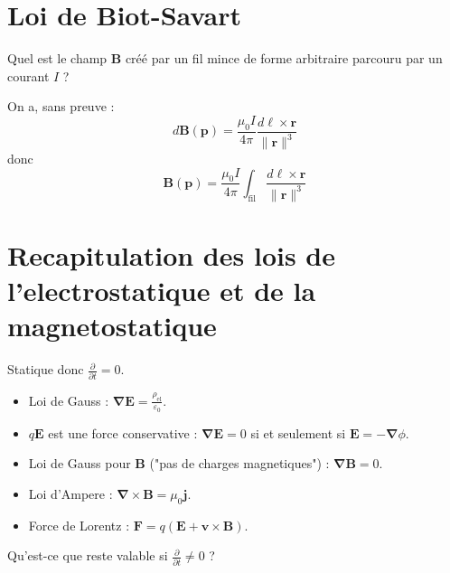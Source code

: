 \section{Loi de Biot-Savart}
\begin{question}
Quel est le champ $\boldsymbol{B}$ créé par un fil mince de forme arbitraire parcouru par un courant $I$ ?
\end{question}
On a, sans preuve :
$$
d\boldsymbol{B}(\boldsymbol{p})=\frac{\mu_{0}I}{4\pi} \frac{d\boldsymbol{\ell}\times \boldsymbol{r}}{\lVert \boldsymbol{r} \rVert ^{3}}
$$
donc
$$
\boldsymbol{B}(\boldsymbol{p})=\frac{\mu_{0}I}{4\pi} \int _{\mathrm{fil}} \frac{d\boldsymbol{\ell}\times \boldsymbol{r}}{\lVert \boldsymbol{r} \rVert ^{3}}
$$

\section{Recapitulation des lois de l'electrostatique et de la magnetostatique}
Statique donc $\frac{ \partial  }{ \partial t }=0$.
\begin{itemize}
\item Loi de Gauss : $\boldsymbol{\nabla E}=\frac{\rho _{\mathrm{el}}}{\varepsilon_{0}}$.
\item $q\boldsymbol{E}$ est une force conservative : $\boldsymbol{\nabla E}=0$ si et seulement si $\boldsymbol{E}=-\boldsymbol{\nabla}\phi$.
\item Loi de Gauss pour $\boldsymbol{B}$ ("pas de charges magnetiques") : $\boldsymbol{\nabla B}=0$.
\item Loi d'Ampere : $\boldsymbol{\nabla }\times \boldsymbol{B}=\mu_{0}\boldsymbol{j}$.
\item Force de Lorentz : $\boldsymbol{F}=q(\boldsymbol{E}+\boldsymbol{v}\times \boldsymbol{B})$.
\end{itemize}
\begin{question}
Qu'est-ce que reste valable si $\frac{ \partial  }{ \partial t }\neq 0$ ?
\end{question}